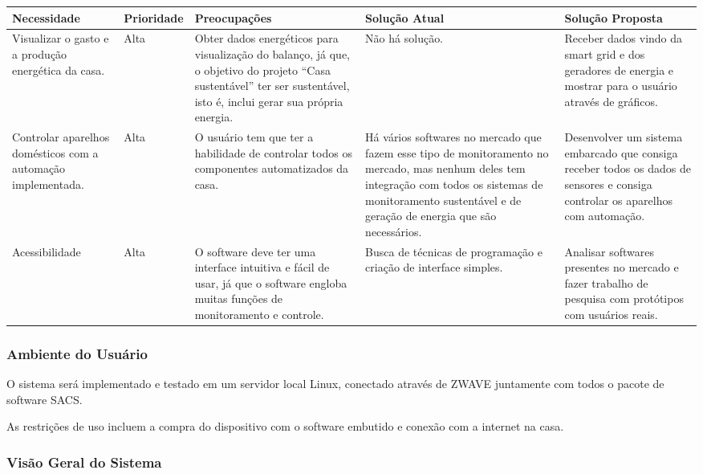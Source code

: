 \begin{longtable}{|m{2.75cm}|m{2cm}|m{3cm}|m{4cm}|m{4cm}|}
	\hline \textbf{Necessidade} & \textbf{Prioridade} & \textbf{Preocupações} & \textbf{Solução Atual} & \textbf{Solução
	 Proposta}\\
	\hline
Visualizar o gasto e a produção energética da casa.
&
Alta
&
Obter dados energéticos para visualização do balanço, já que, o objetivo do projeto “Casa sustentável” ter ser
sustentável, isto é, inclui gerar sua própria energia.
&
Não há solução.
&
Receber dados vindo da smart grid e dos geradores de energia e mostrar para o usuário através de gráficos.
\\
	\hline
Controlar aparelhos domésticos com a automação implementada.
&
Alta
&
O usuário tem que ter a habilidade de controlar todos os componentes automatizados da casa.
&
Há vários softwares no mercado que fazem esse tipo de monitoramento no mercado, mas nenhum deles tem integração com
todos os sistemas de monitoramento sustentável e de geração de energia que são necessários.
&
Desenvolver um sistema embarcado que consiga receber todos os dados de sensores e consiga controlar os aparelhos com
automação.
\\
	\hline
Acessibilidade
&
Alta
&
O software deve ter uma interface intuitiva e fácil de usar, já que o software engloba muitas funções de monitoramento
e controle.
&
Busca de técnicas de programação e criação de interface simples.
&
Analisar softwares presentes no mercado e fazer trabalho de pesquisa com protótipos com usuários reais.
\\
	\hline
\end{longtable}

\subsubsection{Ambiente do Usuário}

	O sistema será implementado e testado em um servidor local Linux, conectado através de ZWAVE juntamente com todos o
	pacote de software SACS.

	As restrições de uso incluem a compra do dispositivo com o software embutido e conexão com a internet na casa.

\subsubsection{Visão Geral do Sistema}

